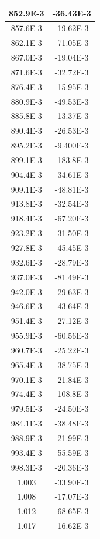 \documentclass[english, 12pt, a4paper]{ifimaster}
\begin{document}
\begin{appendices}
\begin{center}
\begin{longtable}[htbp]{|c|c|}
\hline
  852.9E-3 & -36.43E-3 \\
\hline
  857.6E-3 & -19.62E-3 \\
\hline
  862.1E-3 & -71.05E-3 \\
\hline
  867.0E-3 & -19.04E-3 \\
\hline
  871.6E-3 & -32.72E-3 \\
\hline
  876.4E-3 & -15.95E-3 \\
\hline
  880.9E-3 & -49.53E-3 \\
\hline
  885.8E-3 & -13.37E-3 \\
\hline
  890.4E-3 & -26.53E-3 \\
\hline
  895.2E-3 & -9.400E-3 \\
\hline
  899.1E-3 & -183.8E-3 \\
\hline
  904.4E-3 & -34.61E-3 \\
\hline
  909.1E-3 & -48.81E-3 \\
\hline
  913.8E-3 & -32.54E-3 \\
\hline
  918.4E-3 & -67.20E-3 \\
\hline
  923.2E-3 & -31.50E-3 \\
\hline
  927.8E-3 & -45.45E-3 \\
\hline
  932.6E-3 & -28.79E-3 \\
\hline
  937.0E-3 & -81.49E-3 \\
\hline
  942.0E-3 & -29.63E-3 \\
\hline
  946.6E-3 & -43.64E-3 \\
\hline
  951.4E-3 & -27.12E-3 \\
\hline
  955.9E-3 & -60.56E-3 \\
\hline
  960.7E-3 & -25.22E-3 \\
\hline
  965.4E-3 & -38.75E-3 \\
\hline
  970.1E-3 & -21.84E-3 \\
\hline
  974.4E-3 & -108.8E-3 \\
\hline
  979.5E-3 & -24.50E-3 \\
\hline
  984.1E-3 & -38.48E-3 \\
\hline
  988.9E-3 & -21.99E-3 \\
\hline
  993.4E-3 & -55.59E-3 \\
\hline
  998.3E-3 & -20.36E-3 \\
\hline
  1.003 & -33.90E-3 \\
\hline
  1.008 & -17.07E-3 \\
\hline
  1.012 & -68.65E-3 \\
\hline
  1.017 & -16.62E-3 \\

\end{longtable}
\end{center}
\end{appendices}
\end{document}
